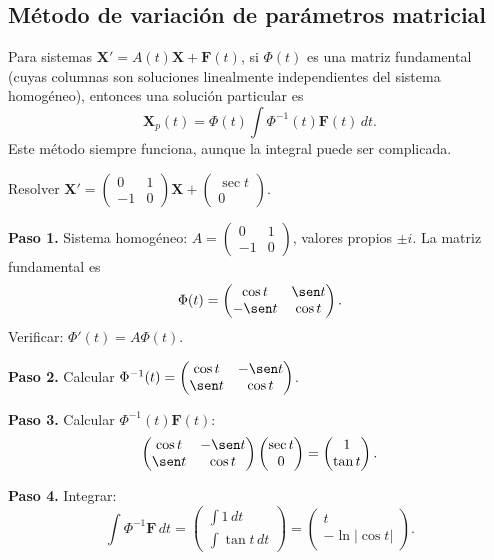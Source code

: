 \subsection{Método de variación de parámetros matricial}

Para sistemas $\mathbf{X}'=A(t)\mathbf{X}+\mathbf{F}(t)$, si $\Phi(t)$ es una matriz fundamental (cuyas columnas son soluciones linealmente independientes del sistema homogéneo), entonces una solución particular es
\[
\mathbf{X}_p(t)=\Phi(t)\int \Phi^{-1}(t)\mathbf{F}(t)\,dt.
\]
Este método siempre funciona, aunque la integral puede ser complicada.

\begin{example}
Resolver $\mathbf{X}'=
\begin{pmatrix}
0&1\\
-1&0
\end{pmatrix}\mathbf{X}
+
\begin{pmatrix}
\sec t\\0
\end{pmatrix}$.
\begin{myproof}
\textbf{Paso 1.} Sistema homogéneo: $A=
\begin{pmatrix}
0&1\\
-1&0
\end{pmatrix}$, valores propios $\pm i$. La matriz fundamental es
\[
\Phi(t)=
\begin{pmatrix}
\cos t&\sen t\\
-\sen t&\cos t
\end{pmatrix}.
\]
Verificar: $\Phi'(t)=A\Phi(t)$.

\textbf{Paso 2.} Calcular $\Phi^{-1}(t)=
\begin{pmatrix}
\cos t&-\sen t\\
\sen t&\cos t
\end{pmatrix}$.

\textbf{Paso 3.} Calcular $\Phi^{-1}(t)\mathbf{F}(t)$:
\[
\begin{pmatrix}
\cos t&-\sen t\\
\sen t&\cos t
\end{pmatrix}
\begin{pmatrix}
\sec t\\0
\end{pmatrix}
=
\begin{pmatrix}
1\\
\tan t
\end{pmatrix}.
\]

\textbf{Paso 4.} Integrar:
\[
\int \Phi^{-1}\mathbf{F}\,dt =
\begin{pmatrix}
\int 1\,dt\\
\int \tan t\,dt
\end{pmatrix}
=
\begin{pmatrix}
t\\
-\ln|\cos t|
\end{pmatrix}.
\]


\end{myproof}
\end{example}
